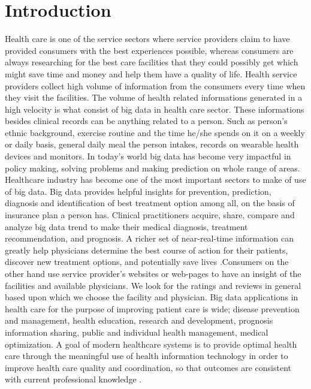 \documentclass[sigconf]{acmart}
\begin{document}
\section{Introduction}
Health care is one of the service sectors where service providers claim to have provided consumers with the best experiences possible, whereas consumers are always researching for the best care facilities that they could possibly get which might save time and money and help them have a quality of life. Health service providers collect high volume of information from the consumers every time when they visit the facilities. The volume of health related informations generated in a high velocity is what consist of big data in health care sector.
These informations besides clinical records can be anything related to a person. Such as  person's ethnic background, exercise routine
and the time he/she spends on it on a weekly or daily basis, general daily meal the person intakes, records on wearable health devices 
and monitors. In today's world big data has become very impactful in policy making, solving problems and making prediction on whole range 
of areas. Healthcare industry has become one of the most important sectors to make of use of big data. Big data provides helpful insights 
for prevention, prediction, diagnosis and identification of best treatment option among all, on the basis of insurance plan a person 
has. Clinical practitioners acquire, share, compare and analyze big data trend to make their medical diagnosis, treatment
recommendation, and prognosis. A richer set of near-real-time information can greatly help
physicians determine the best course of action for their patients, discover new treatment
options, and potentially save lives \cite{www-hpe}.Consumers on the other hand use service provider's websites or web-pages to have an insight of the facilities and available physicians.
We look for the ratings and reviews in general based upon which we choose the facility and physician. Big data applications in health care for the purpose of
improving patient care is wide; disease prevention and management, health education, research and development, prognosis  
information sharing, public and individual health management, medical optimization. A goal of modern healthcare systems is to provide optimal health care through the meaningful use of health information technology in order to improve health care quality and coordination, so that outcomes are consistent with current professional knowledge \cite{www-mapr-com}.
\end{document}
